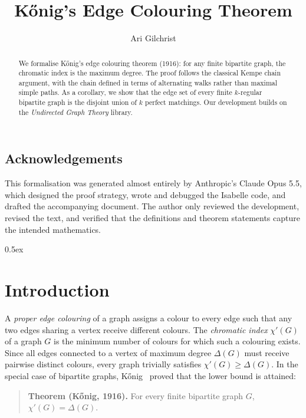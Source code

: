 \documentclass[11pt,a4paper]{article}
\begin{document}
\title{K\H{o}nig's Edge Colouring Theorem}
\author{Ari Gilchrist}
\maketitle

\begin{abstract}
  We formalise K\H{o}nig's edge colouring theorem (1916): for any finite bipartite graph, the
  chromatic index is the maximum degree. The proof follows the classical
  Kempe chain argument, with the chain defined in terms of alternating
  walks rather than maximal simple paths. As a corollary, we show that the edge set of every finite $k$-regular bipartite graph is the disjoint
  union of $k$ perfect matchings. Our development builds on the
  \emph{Undirected Graph Theory} library.
\end{abstract}

\subsection*{Acknowledgements}
This formalisation was generated almost entirely by Anthropic's Claude
Opus 5.5, which designed the proof strategy, wrote and debugged the Isabelle code, and
drafted the accompanying document. The author only reviewed the development,
revised the text, and verified that the definitions and theorem statements capture the intended
mathematics.

\tableofcontents

\parindent 0pt\parskip 0.5ex

\section{Introduction}

A \emph{proper edge colouring} of a graph assigns a colour to every edge such
that any two edges sharing a vertex receive different colours. The
\emph{chromatic index} $\chi'(G)$ of a graph $G$ is the minimum number of
colours for which such a colouring exists. Since all edges connected to a vertex of
maximum degree $\Delta(G)$ must receive pairwise distinct colours, every graph trivially
satisfies $\chi'(G) \geq \Delta(G)$. In the special case of bipartite graphs,
K\H{o}nig~\cite{koenig1916} proved that the lower bound is attained:

\begin{quote}
  \textbf{Theorem (K\H{o}nig, 1916).} For every finite bipartite graph $G$,
  $\chi'(G) = \Delta(G)$.
\end{quote}
\end{document}
